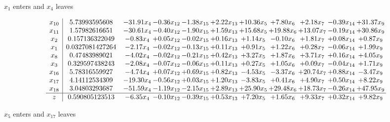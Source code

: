 \documentclass[9pt]{article}
\begin{document}
 $ x_{1} $ enters and $ x_{4} $ leaves 

 \[\begin{array}{c| c c@{\hskip 2pt} c@{\hskip 2pt} c@{\hskip 2pt} c@{\hskip 2pt} c@{\hskip 2pt} c@{\hskip 2pt} c@{\hskip 2pt} c@{\hskip 2pt} c@{\hskip 2pt} }
 x_{10}   &  5.73993595608 & -31.91 x_{4} & -0.36 x_{12} & -1.38 x_{15} & +  2.22 x_{13} & + 10.36 x_{5} & +  7.80 x_{6} & +  2.18 x_{7} & -0.39 x_{14} & + 31.37 x_{9}\\
 x_{11}   &  1.57982616651 & -30.61 x_{4} & -0.40 x_{12} & -1.90 x_{15} & +  1.59 x_{13} & + 15.68 x_{5} & + 19.88 x_{6} & + 13.07 x_{7} & -0.19 x_{14} & + 30.86 x_{9}\\
 x_{2}   &  0.157136322049 & -0.83 x_{4} & +  0.05 x_{12} & -0.02 x_{15} & +  0.16 x_{13} & +  1.14 x_{5} & -0.10 x_{6} & +  1.81 x_{7} & +  0.08 x_{14} & +  0.87 x_{9}\\
 x_{1}   &  0.0327081427264 & -2.17 x_{4} & -0.02 x_{12} & -0.13 x_{15} & +  0.11 x_{13} & +  0.91 x_{5} & +  1.22 x_{6} & +  0.28 x_{7} & -0.06 x_{14} & +  1.99 x_{9}\\
 x_{8}   &  0.47483989021 & -4.02 x_{4} & -0.02 x_{12} & -0.21 x_{15} & +  0.42 x_{13} & +  3.27 x_{5} & +  1.87 x_{6} & +  3.71 x_{7} & +  0.16 x_{14} & +  4.05 x_{9}\\
 x_{3}   &  0.329597438243 & -2.08 x_{4} & -0.07 x_{12} & -0.06 x_{15} & +  0.11 x_{13} & +  0.27 x_{5} & +  1.05 x_{6} & +  0.09 x_{7} & -0.04 x_{14} & +  1.71 x_{9}\\
 x_{16}   &  5.78316559927 & -4.74 x_{4} & +  0.07 x_{12} & +  0.69 x_{15} & +  0.82 x_{13} & -4.53 x_{5} & -3.37 x_{6} & + 20.74 x_{7} & +  0.88 x_{14} & -3.47 x_{9}\\
 x_{17}   &  4.14112534309 & -19.30 x_{4} & -0.56 x_{12} & +  0.03 x_{15} & +  1.20 x_{13} & -3.83 x_{5} & +  0.41 x_{6} & +  4.90 x_{7} & +  0.50 x_{14} & +  8.22 x_{9}\\
 x_{18}   &  3.04803293687 & -51.59 x_{4} & -1.19 x_{12} & -2.15 x_{15} & +  2.89 x_{13} & + 25.90 x_{5} & + 29.48 x_{6} & + 18.73 x_{7} & -0.26 x_{14} & + 47.95 x_{9}\\
\hline
z    &  0.590805123513 & -6.35 x_{4} & -0.10 x_{12} & -0.39 x_{15} & +  0.53 x_{13} & +  7.20 x_{5} & +  1.65 x_{6} & +  9.33 x_{7} & +  0.32 x_{14} & +  9.82 x_{9}\\
\end{array}\]


 $ x_{5} $ enters and $ x_{17} $ leaves 
\end{document}
